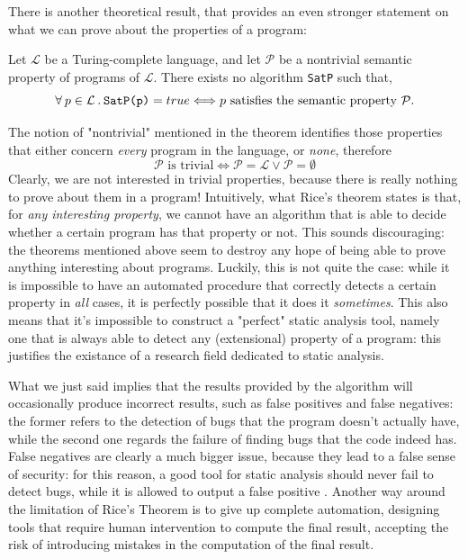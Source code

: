 \documentclass[12pt,a4paper]{book}
\newcommand{\st}{\hspace{2px}.\hspace{2px}}
\theoremstyle{definition}
\begin{document}
	There is another theoretical result, that provides an even stronger statement on what we can prove about the properties of a program:
	\begin{thm} Let $\mathcal{L}$ be a Turing-complete language, and let $\mathcal{P}$ be a nontrivial semantic property of programs of $\mathcal{L}$. There exists no algorithm \texttt{SatP} such that,
		\[
		\forall\hspace{2px}p\in\mathcal{L}\st\texttt{SatP(p)} = true \Longleftrightarrow p\text{ satisfies the semantic property } \mathcal{P}. 	
		\]
	\end{thm}
	The notion of "nontrivial" mentioned in the theorem identifies those properties that either concern \textit{every} program in the language, or \textit{none}, therefore
	\[
	\mathcal{P}\text{ is trivial} \Longleftrightarrow \mathcal{P} = \mathcal{L} \vee \mathcal{P} = \emptyset
	\]
	Clearly, we are not interested in trivial properties, because there is really nothing to prove about them in a program!
	Intuitively, what Rice's theorem states is that, for \textit{any interesting property}, we cannot have an algorithm that is able to decide whether a certain program has that property or not. This sounds discouraging: the theorems mentioned above seem to destroy any hope of being able to prove anything interesting about programs. Luckily, this is not quite the case: while it is impossible to have an automated procedure that correctly detects a certain property in \textit{all} cases, it is perfectly possible that it does it \textit{sometimes}. This also means that it's impossible to construct a "perfect" static analysis tool, namely one that is always able to detect any (extensional) property of a program: this justifies the existance of a research field dedicated to static analysis.
	
	What we just said implies that the results provided by the algorithm will occasionally produce incorrect results, such as false positives and false negatives: the former refers to the detection of bugs that the program doesn't actually have, while the second one regards the failure of finding bugs that the code indeed has. False negatives are clearly a much bigger issue, because they lead to a false sense of security: for this reason, a good tool for static analysis should never fail to detect bugs, while it is allowed to output a false positive \cite{Gomes2009}. Another way around the limitation of Rice's Theorem is to give up complete automation, designing tools that require human intervention to compute the final result, accepting the risk of introducing mistakes in the computation of the final result.
	
\end{document}
